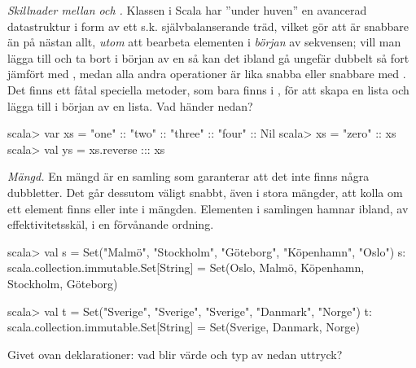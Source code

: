 {{\Subtask \emph{Skillnader mellan  och .} Klassen  i Scala har ''under huven'' en avancerad datastruktur i form av ett s.k. självbalanserande träd, vilket gör att  är snabbare än  på nästan allt, \emph{utom} att bearbeta elementen i \emph{början} av sekvensen; vill man lägga till och ta bort i början av en  så kan det ibland gå ungefär dubbelt så fort jämfört med , medan alla andra operationer är lika snabba eller snabbare med . Det finns ett fåtal speciella metoder, som bara finns i , för att skapa en lista och lägga till i början av en lista. Vad händer nedan?

\begin{REPL}
scala> var xs = "one" :: "two" :: "three" :: "four" :: Nil
scala> xs = "zero" :: xs
scala> val ys = xs.reverse ::: xs
\end{REPL}


\Task \emph{Mängd.} En mängd är en samling som garanterar att det inte finns några dubbletter. Det går dessutom väligt snabbt, även i stora mängder, att kolla om ett element finns eller inte i mängden. Elementen i samlingen  hamnar ibland, av effektivitetsskäl, i en förvånande ordning.
\begin{REPL}
scala> val s = Set("Malmö", "Stockholm", "Göteborg", "Köpenhamn", "Oslo")
s: scala.collection.immutable.Set[String] = 
     Set(Oslo, Malmö, Köpenhamn, Stockholm, Göteborg)

scala> val t = Set("Sverige", "Sverige", "Sverige", "Danmark", "Norge")
t: scala.collection.immutable.Set[String] = Set(Sverige, Danmark, Norge)
\end{REPL}
Givet ovan deklarationer: vad blir värde och typ av nedan uttryck?

\Subtask {}

\Subtask {}

\Subtask {}

\Subtask {}

\Subtask {}

\Subtask {}

\Subtask {}

\Subtask {}

\Subtask {}

\Subtask {}

}}
